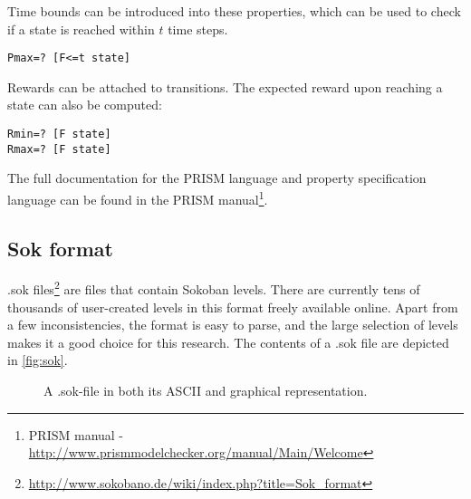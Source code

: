 Time bounds can be introduced into these properties, which can be used to check if a state is reached within $t$ time steps.
\begin{lstlisting}[language=PRISM]
Pmax=? [F<=t state]
\end{lstlisting}

Rewards can be attached to transitions. The expected reward upon reaching a state can also be computed:
\begin{lstlisting}[language=PRISM]
Rmin=? [F state]
Rmax=? [F state]
\end{lstlisting}
The full documentation for the PRISM language and property specification language can be found in the PRISM manual\footnote{PRISM manual - \url{http://www.prismmodelchecker.org/manual/Main/Welcome}}.

\subsection{Sok format}
.sok files\footnote{\url{http://www.sokobano.de/wiki/index.php?title=Sok_format}} are files that contain Sokoban levels. There are currently tens of thousands of user-created levels in this format freely available online. Apart from a few inconsistencies, the format is easy to parse, and the large selection of levels makes it a good choice for this research. The contents of a .sok file are depicted in \autoref{fig:sok}.

\begin{figure}[h]
    \hfill
    \caption{A .sok-file in both its ASCII and graphical representation.}
    \label{fig:sok}
\end{figure}
